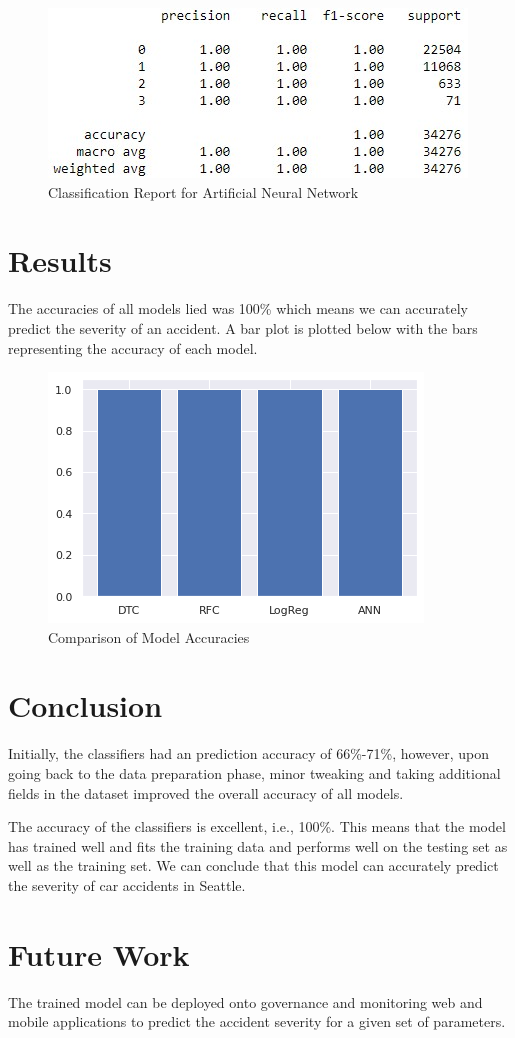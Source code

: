 \documentclass{article}
\begin{document}
\begin{figure}[H]
  \centering
  \includegraphics[scale=0.8]{nnreport.jpg}
  \caption{Classification Report for Artificial Neural Network}
\end{figure}

\section{Results}

The accuracies of all models lied was 100\% which means we can accurately predict the severity of an accident. A bar plot is plotted below with the bars representing the accuracy of each model.

\begin{figure}[h]
  \centering
  \includegraphics[scale=0.8]{modelcomp.png}
  \caption{Comparison of Model Accuracies}
\end{figure}

\section{Conclusion}

Initially, the classifiers had an prediction accuracy of 66\%-71\%, however, upon going back to the data preparation phase, minor tweaking and taking additional fields in the dataset improved the overall accuracy of all models.

The accuracy of the classifiers is excellent, i.e., 100\%. This means that the model has trained well and fits the training data and performs well on the testing set as well as the training set. We can conclude that this model can accurately predict the severity of car accidents in Seattle.

\section{Future Work}

The trained model can be deployed onto governance and monitoring web and mobile applications to predict the accident severity for a given set of parameters.
\end{document}
